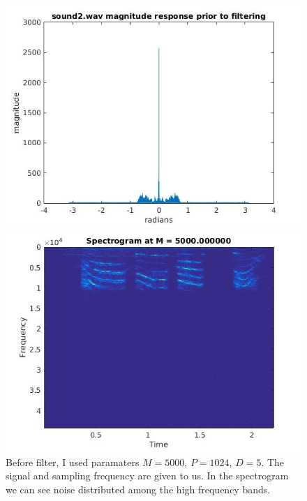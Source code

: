\documentclass{article}
\begin{document}
\begin{figure}[H]
\includegraphics[scale = .5]{report7_1}
\includegraphics[scale = .5]{report7_2}
\\Before filter, I used paramaters $M = 5000$, $P = 1024$, $D = 5$. The signal and sampling frequency are given to us.
In the spectrogram we can see noise distributed among the high frequency bands.
\end{figure}
\end{document}

